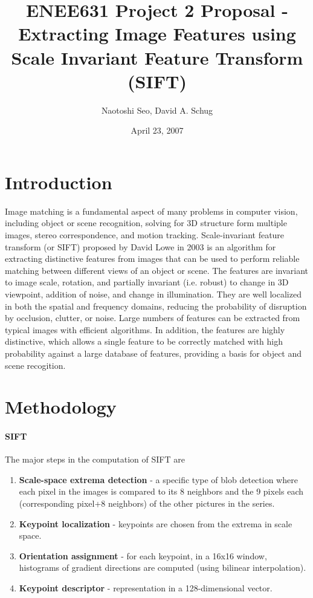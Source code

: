 \documentclass[article,oneside]{memoir}
\title {ENEE631 Project 2 Proposal - Extracting Image Features using Scale Invariant Feature Transform (SIFT)}
\author{Naotoshi Seo, David A. Schug}
\date{April 23, 2007}
\begin{document}
\maketitle


\chapter{Introduction}

Image matching is a fundamental aspect of many problems in computer vision, including object or scene recognition, solving for 3D structure form multiple images, stereo correspondence, and motion tracking. Scale-invariant feature transform (or SIFT) proposed by David Lowe in 2003 \cite{SIFT} is an algorithm for extracting distinctive features from images that can be used to perform reliable matching between different views of an object or scene. The features are invariant to image scale, rotation, and partially invariant (i.e. robust) to change in 3D viewpoint, addition of noise, and change in illumination. They are well localized in both the spatial and frequency domains, reducing the probability of disruption by occlusion, clutter, or noise. Large numbers of features can be extracted from typical images with efficient algorithms. In addition, the features are highly distinctive, which allows a single feature to be correctly matched with high probability against a large database of features, providing a basis for object and scene recogition.

\chapter{Methodology}

\subsubsection{SIFT}

The major steps in the computation of SIFT are \cite{SIFT}

\begin{enumerate}
\item \textbf{Scale-space extrema detection} - a specific type of blob detection where each pixel in the images is compared to its 8 neighbors and the 9 pixels each (corresponding pixel+8 neighbors) of the other pictures in the series.
\item \textbf{Keypoint localization} - keypoints are chosen from the extrema in scale space.
\item \textbf{Orientation assignment} - for each keypoint, in a 16x16 window, histograms of gradient directions are computed (using bilinear interpolation).
\item \textbf{Keypoint descriptor} - representation in a 128-dimensional vector.
\end{enumerate}
\end{document}
